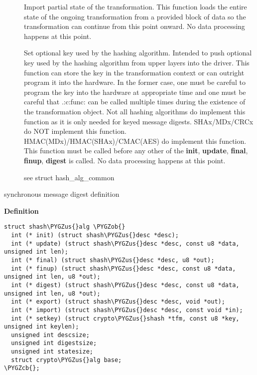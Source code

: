 \documentclass[a4paper,8pt,english]{sphinxmanual}
\def\PYGZus{\char`\_}
\def\PYGZob{\char`\{}
\def\PYGZcb{\char`\}}
\begin{document}
\begin{description}
\item[{}] \leavevmode
Import partial state of the transformation. This function loads the
entire state of the ongoing transformation from a provided block of
data so the transformation can continue from this point onward. No
data processing happens at this point.

\item[{}] \leavevmode
Set optional key used by the hashing algorithm. Intended to push
optional key used by the hashing algorithm from upper layers into
the driver. This function can store the key in the transformation
context or can outright program it into the hardware. In the former
case, one must be careful to program the key into the hardware at
appropriate time and one must be careful that .:c:func: can be
called multiple times during the existence of the transformation
object. Not  all hashing algorithms do implement this function as it
is only needed for keyed message digests. SHAx/MDx/CRCx do NOT
implement this function. HMAC(MDx)/HMAC(SHAx)/CMAC(AES) do implement
this function. This function must be called before any other of the
\textbf{init}, \textbf{update}, \textbf{final}, \textbf{finup}, \textbf{digest} is called. No data
processing happens at this point.

\item[{}] \leavevmode
see struct hash\_alg\_common

\end{description}

\begin{fulllineitems}
\label{crypto/api-digest:c.shash_alg}
synchronous message digest definition

\end{fulllineitems}


\textbf{Definition}

\begin{Verbatim}[commandchars=\\\{\}]
struct shash\PYGZus{}alg \PYGZob{}
  int (* init) (struct shash\PYGZus{}desc *desc);
  int (* update) (struct shash\PYGZus{}desc *desc, const u8 *data, unsigned int len);
  int (* final) (struct shash\PYGZus{}desc *desc, u8 *out);
  int (* finup) (struct shash\PYGZus{}desc *desc, const u8 *data, unsigned int len, u8 *out);
  int (* digest) (struct shash\PYGZus{}desc *desc, const u8 *data, unsigned int len, u8 *out);
  int (* export) (struct shash\PYGZus{}desc *desc, void *out);
  int (* import) (struct shash\PYGZus{}desc *desc, const void *in);
  int (* setkey) (struct crypto\PYGZus{}shash *tfm, const u8 *key, unsigned int keylen);
  unsigned int descsize;
  unsigned int digestsize;
  unsigned int statesize;
  struct crypto\PYGZus{}alg base;
\PYGZcb{};
\end{Verbatim}
\end{document}
